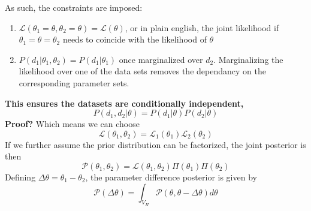 As such, the constraints are imposed:
\begin{enumerate}
    \item $\mathcal{L}(\theta_1=\theta,\theta_2=\theta) = \mathcal{L}(\theta)$, or in plain english, the joint likelihood if $\theta_1=\theta=\theta_2$ needs to coincide with the likelihood of $\theta$
    \item $P(d_1|\theta_1,\theta_2)=P(d_1|\theta_1)$ once marginalized over $d_2$. Marginalizing the likelihood over one of the data sets removes the dependancy on the corresponding parameter sets.
\end{enumerate}
 \textbf{This ensures the datasets are conditionally independent,}
    $$ P(d_1,d_2|\theta) = P(d_1|\theta)P(d_2|\theta)$$
\textbf{Proof?}
Which means we can choose $$\mathcal{L}(\theta_1,\theta_2) = \mathcal{L}_1(\theta_1)\mathcal{L}_2(\theta_2)$$
If we further assume the prior distribution can be factorized, the joint posterior is then
$$ \mathcal{P}(\theta_1,\theta_2) = \mathcal{L}(\theta_1,\theta_2)\Pi(\theta_1)\Pi(\theta_2) $$
Defining $\Delta\theta = \theta_1-\theta_2$, the parameter difference posterior is given by
\[ \mathcal{P}(\Delta\theta) = \int_{V_\Pi} \mathcal{P}(\theta,\theta-\Delta\theta)d\theta\]